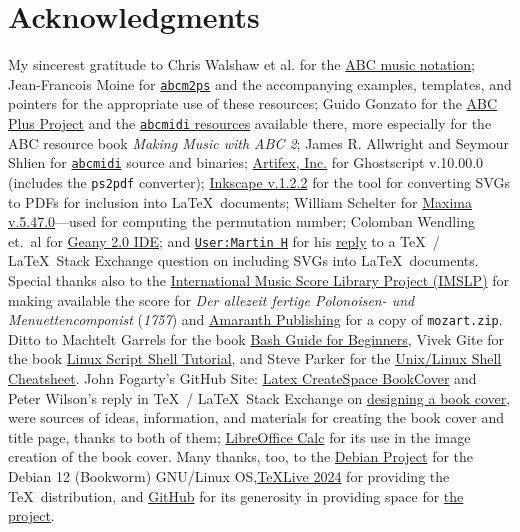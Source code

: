 \documentclass[a4paper,x11names,svgnames,10pt]{article}
\begin{document}
\section{Acknowledgments}
My sincerest gratitude to Chris Walshaw et al. for the \href{http://www.abcnotation.com/}{ABC music notation}; Jean-Francois Moine for \href{http://moinejf.free.fr/}{\tt abcm2ps} and the accompanying examples, templates, and pointers for the appropriate use of these resources; Guido Gonzato for the \href{http://abcplus.sourceforge.net/}{ABC Plus Project} and the \href{http://abcplus.sourceforge.net/#abcMIDI}{{\tt abcmidi} resources} available there, more especially for the ABC resource book {\em Making Music with ABC 2}; James R. Allwright and Seymour Shlien for \href{http://abc.sourceforge.net/abcMIDI}{\tt abcmidi} source and binaries; \href{https://artifex.com/}{Artifex, Inc.} for Ghostscript v.10.00.0 (includes the {\tt ps2pdf} converter); \href{https://www.inkscape.org/}{Inkscape v.1.2.2} for the tool for converting SVGs to PDFs for inclusion into \LaTeX\ documents; William Schelter for \href{https://maxima.sourceforge.io}{Maxima v.5.47.0}---used for computing the permutation number; Colomban Wendling et.\ al for \href{https://www.geany.org}{Geany 2.0 IDE}; and \href{https://tex.stackexchange.com/users/632/martin-h}{\tt User:Martin H} for his \href{https://tex.stackexchange.com/questions/2099/how-to-include-svg-diagrams-in-latex}{reply} to a \TeX\ / \LaTeX\ Stack Exchange question on including SVGs into \LaTeX\ documents. Special thanks also to the \href{http://imslp.org/}{International Music Score Library Project (IMSLP)} for making available the score for {\it Der allezeit fertige Polonoisen- und Menuettencomponist} ({\it 1757}) and \href{http://www.amaranthpublishing.com/MozartDiceGame.htm}{Amaranth Publishing} for a copy of {\tt mozart.zip}. Ditto to Machtelt Garrels for the book \href{http://tldp.org/LDP/Bash-Beginners-Guide/html/Bash-Beginners-Guide.html}{Bash Guide for Beginners}, Vivek Gite for the book \href{http://www.freeos.com/guides/lsst/}{Linux Script Shell Tutorial}, and Steve Parker for the \href{http://steve-parker.org/sh/cheatsheet.pdf}{Unix/Linux Shell Cheatsheet}. John Fogarty's GitHub Site: \href{https://github.com/jfogarty/latex-createspace-bookcover}{Latex CreateSpace BookCover} and Peter Wilson's reply in \TeX\ / \LaTeX\ Stack Exchange on \href{https://tex.stackexchange.com/questions/17579/how-can-i-design-a-book-cover}{designing a book cover}, were sources of ideas, information, and materials for creating the book cover and title page, thanks to both of them; \href{http://www.libreoffice.org/}{LibreOffice Calc} for its use in the image creation of the book cover.  Many thanks, too, to the \href{https://www.debian.org}{Debian Project} for the Debian 12 (Bookworm) GNU/Linux OS,\href{http://www.tug.org/texlive/}{TeXLive 2024} for providing the \TeX\ distribution,  and \href{https://github.com}{GitHub} for its generosity in providing space for \href{https://github.com/justineuro/mdgBookSVG3Kit}{the project}.
\end{document}
